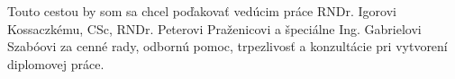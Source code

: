 \indent Touto cestou by som sa chcel poďakovať vedúcim práce RNDr. Igorovi Kossaczkému, CSc, RNDr. Peterovi Praženicovi a špeciálne Ing. Gabrielovi Szabóovi za cenné rady, odbornú pomoc, trpezlivosť a konzultácie pri vytvorení diplomovej práce.